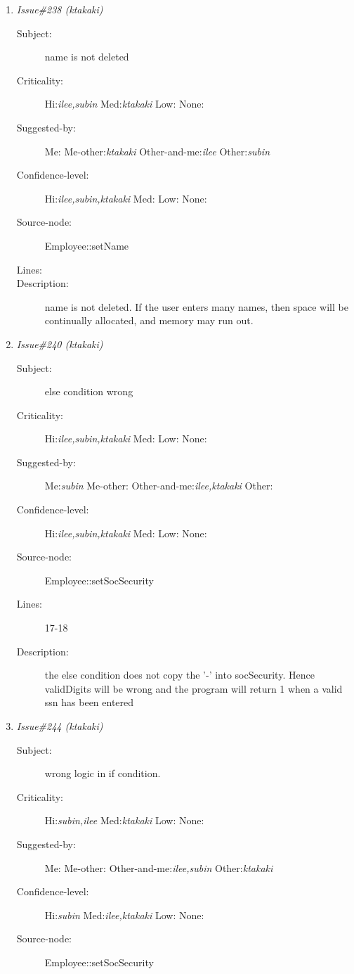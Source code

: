 \begin{enumerate}
\begin{description}
\item [Lines:] 7-8

\item [Description:] when invoking strlen, name needs to be null 
terminated.
\end{description}
\item {\it Issue\#238 (ktakaki)}
\begin{description}
\item [Subject:] name is not deleted
\item [Criticality:] Hi:{\it ilee,subin} Med:{\it ktakaki} Low:{\it } None:{\it }
\item [Suggested-by:] Me:{\it } Me-other:{\it ktakaki} Other-and-me:{\it ilee} Other:{\it subin}
\item [Confidence-level:] Hi:{\it ilee,subin,ktakaki} Med:{\it } Low:{\it } None:{\it }
\item [Source-node:] Employee::setName

\item [Lines:] 

\item [Description:] name is not deleted.  If the user enters
many names, then space will be continually allocated, and memory may run out.
\end{description}
\item {\it Issue\#240 (ktakaki)}
\begin{description}
\item [Subject:] else condition wrong
\item [Criticality:] Hi:{\it ilee,subin,ktakaki} Med:{\it } Low:{\it } None:{\it }
\item [Suggested-by:] Me:{\it subin} Me-other:{\it } Other-and-me:{\it ilee,ktakaki} Other:{\it }
\item [Confidence-level:] Hi:{\it ilee,subin,ktakaki} Med:{\it } Low:{\it } None:{\it }
\item [Source-node:] Employee::setSocSecurity

\item [Lines:] 17-18

\item [Description:] the else condition does not copy the '-' 
into socSecurity.  Hence validDigits will be wrong and the program will
return 1 when a valid ssn has been entered
\end{description}
\item {\it Issue\#244 (ktakaki)}
\begin{description}
\item [Subject:] wrong logic in if condition.
\item [Criticality:] Hi:{\it subin,ilee} Med:{\it ktakaki} Low:{\it } None:{\it }
\item [Suggested-by:] Me:{\it } Me-other:{\it } Other-and-me:{\it ilee,subin} Other:{\it ktakaki}
\item [Confidence-level:] Hi:{\it subin} Med:{\it ilee,ktakaki} Low:{\it } None:{\it }
\item [Source-node:] Employee::setSocSecurity


\end{description}
\end{enumerate}
